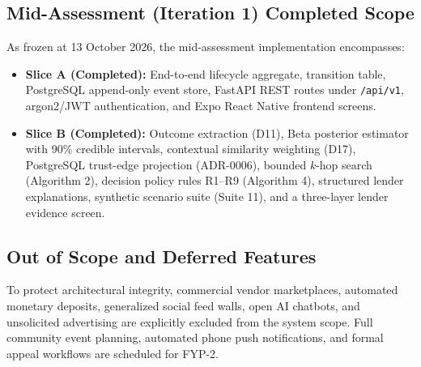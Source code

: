 \subsection{Mid-Assessment (Iteration 1) Completed Scope}
As frozen at 13 October 2026, the mid-assessment implementation encompasses:
\begin{itemize}
    \item \textbf{Slice A (Completed):} End-to-end lifecycle aggregate, transition table, PostgreSQL append-only event store, FastAPI REST routes under \texttt{/api/v1}, argon2/JWT authentication, and Expo React Native frontend screens.
    \item \textbf{Slice B (Completed):} Outcome extraction (D11), Beta posterior estimator with 90\% credible intervals, contextual similarity weighting (D17), PostgreSQL trust-edge projection (ADR-0006), bounded $k$-hop search (Algorithm 2), decision policy rules R1--R9 (Algorithm 4), structured lender explanations, synthetic scenario suite (Suite 11), and a three-layer lender evidence screen.
\end{itemize}

\subsection{Out of Scope and Deferred Features}
To protect architectural integrity, commercial vendor marketplaces, automated monetary deposits, generalized social feed walls, open AI chatbots, and unsolicited advertising are explicitly excluded from the system scope. Full community event planning, automated phone push notifications, and formal appeal workflows are scheduled for FYP-2.

